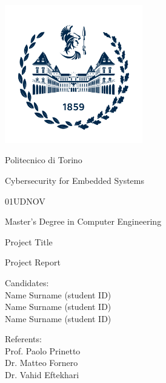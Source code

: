 \documentclass[10pt,  english, makeidx, a4paper, titlepage, oneside]{book}
\begin{document}
\frontmatter
\begin{titlepage}
\vspace{0cm}
\centerline{
\includegraphics[width=6cm]{./logopolitonuovo}} 
\vspace{0.5cm}
\centerline{\LARGE Politecnico di Torino}
\vspace{2.5cm}
\centerline{\huge Cybersecurity for Embedded Systems}
\vspace{0.25cm}
\centerline{\huge 01UDNOV}
\vspace{1cm}
\centerline{\Large Master's Degree in Computer Engineering}
\vspace{2.5cm}
\centerline{\Huge Project Title}
\bigskip
\centerline{\huge Project Report}
\vspace{2cm}
\vfill
\begin{minipage}{6.5cm} %
\Large{Candidates:\\
Name Surname (student ID)\\
Name Surname (student ID)\\
Name Surname (student ID)}
\end{minipage}
\hfill
\begin{minipage}{4.4cm}
\Large{Referents: \\
Prof. Paolo Prinetto\\
Dr. Matteo Fornero\\
Dr. Vahid Eftekhari}
\end{minipage}
\end{titlepage}

\tableofcontents
\listoffigures %
\listoftables %

\mainmatter
    











    

\appendix



\end{document}
